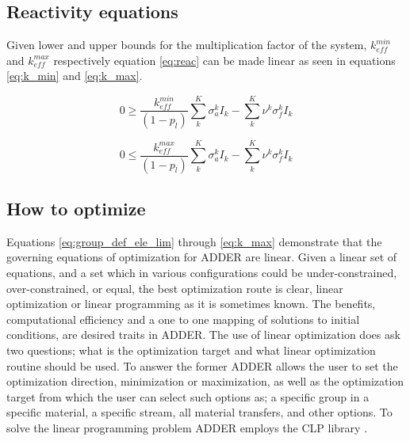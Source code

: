 \documentclass[]{elsarticle}
\begin{document}
\subsection{Reactivity equations}
Given lower and upper bounds for the multiplication factor of the system,
$k_{eff}^{min}$ and $k_{eff}^{max}$ respectively equation \ref{eq:reac} can be 
made linear as seen in equations \ref{eq:k_min} and \ref{eq:k_max}.

\begin{equation}
\label{eq:k_min}
0 \geq \frac{k_{eff}^{min}}{(1 - p_{l})} \sum \limits_{k}^{K} \sigma_{a}^{k} I_{k} - \sum \limits_{k}^{K} \nu^{k} \sigma_{f}^{k} I_{k}
\end{equation}

\begin{equation}
\label{eq:k_max}
0 \leq \frac{k_{eff}^{max}}{(1 - p_{l})} \sum \limits_{k}^{K} \sigma_{a}^{k} I_{k} - \sum \limits_{k}^{K} \nu^{k} \sigma_{f}^{k} I_{k}
\end{equation}

\subsection{How to optimize}
Equations \ref{eq:group_def_ele_lim} through \ref{eq:k_max} demonstrate that
the governing equations of optimization for ADDER are linear. Given a linear
set of equations, and a set which in various configurations could be
under-constrained, over-constrained, or equal, the best optimization route is
clear, linear optimization or linear programming as it is sometimes known.
The benefits, computational efficiency and a one to one mapping of solutions
to initial conditions, are desired traits in ADDER. The use of linear 
optimization 
does ask two questions; what is the optimization target and what linear
optimization routine should be used. To answer the former ADDER allows the user
to set the optimization direction, minimization or maximization, as well as
the optimization target from which the user can select such options as; a
specific group in a specific material, a specific stream, all material transfers,
and other options. To solve the linear programming problem ADDER employs the
CLP library \cite{lougee-heimer_common_2003}.
\end{document}
